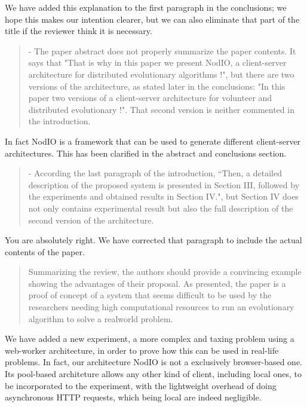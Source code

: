 \documentclass[preprint]{elsarticle}
\begin{document}
We have added this explanation to the first paragraph in the
conclusions; we hope this makes our intention clearer, but we can also
eliminate that part of the title if the reviewer think it is
necessary.

\begin{quote}
- The paper abstract does not properly summarize the paper contents. It says that "That is why in this
paper we present NodIO, a client-server architecture for distributed evolutionary algorithms !", but there
are two versions of the architecture, as stated later in the conclusions: "In this paper two versions of a
client-server architecture for volunteer and distributed evolutionary !". That second version is neither
commented in the introduction.
\end{quote}

In fact {\sf NodIO} is a framework that can be used to generate
different client-server architectures. This has been clarified in the
abstract and conclusions section. 

\begin{quote}
- According the last paragraph of the introduction, ``Then, a detailed description of the proposed system is
presented in Section III, followed by the experiments and obtained results in Section IV.", but Section IV
does not only contains experimental result but also the full description of the second version of the
architecture.
\end{quote}

You are absolutely right. We have corrected that paragraph to include
the actual contents of the paper. 

\begin{quote}
Summarizing the review, the authors should provide a convincing example showing the advantages of
their proposal. As presented, the paper is a proof of concept of a system that seems difficult to be used
by the researchers needing high computational resources to run an evolutionary algorithm to solve a realworld
problem.
\end{quote}

We have added a new experiment, a more complex and taxing problem
using a web-worker architecture, in order to prove how this can be
used in real-life problems. In fact, our architecture {\sf NodIO} is
not a exclusively browser-based one. Its pool-based architeture allows
any other kind of client, including local ones, to be incorporated to
the experiment, with the lightweight overhead of doing asynchronous
HTTP requests, which being local are indeed negligible. 
\end{document}

